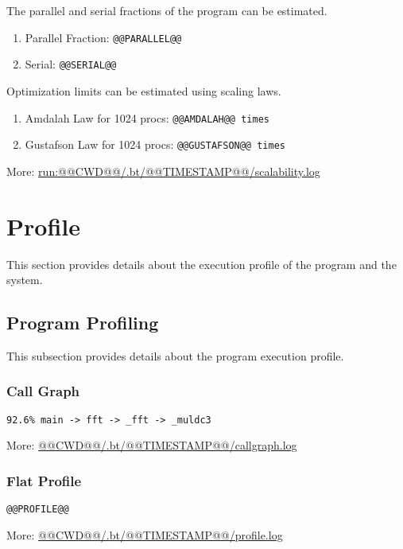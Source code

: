 \documentclass[a4paper]{article}
\begin{document}
The parallel and serial fractions of the program can be estimated.

\begin{enumerate}
\item Parallel Fraction: {\tt @@PARALLEL@@}
\item Serial: {\tt @@SERIAL@@}
\end{enumerate}

Optimization limits can be estimated using scaling laws.

\begin{enumerate}
\item Amdalah Law for 1024 procs: {\tt @@AMDALAH@@ times}
\item Gustafson Law for 1024 procs: {\tt @@GUSTAFSON@@ times}
\end{enumerate}

More: \url{run:@@CWD@@/.bt/@@TIMESTAMP@@/scalability.log}

\section{Profile}

This section provides details about the execution profile of the program and the system.

\subsection{Program Profiling}

This subsection provides details about the program execution profile.

\subsubsection{Call Graph}

\begin{verbatim}
92.6% main -> fft -> _fft -> _muldc3
\end{verbatim}

More: \url{@@CWD@@/.bt/@@TIMESTAMP@@/callgraph.log}

\subsubsection{Flat Profile}

\begin{verbatim}
@@PROFILE@@
\end{verbatim}

More: \url{@@CWD@@/.bt/@@TIMESTAMP@@/profile.log}
\end{document}
